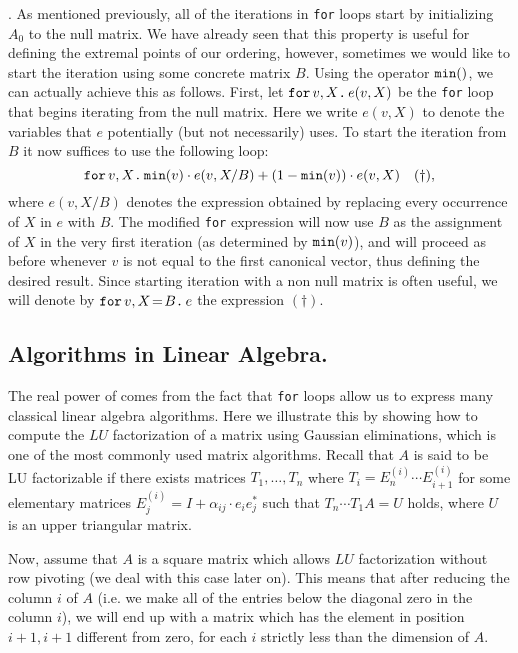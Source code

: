 .  As mentioned previously, all of the iterations in \texttt{for} loops start by initializing $A_0$ to the null matrix. We have already seen that this property is useful for defining the extremal points of our ordering, however, sometimes we would like to start the iteration using some concrete matrix $B$. Using the operator $\mmin$, we can actually achieve this as follows. First, let $\ffor{v}{X}{e(v,X)}$ be the \texttt{for} loop that begins iterating from the null matrix. Here we write $e(v,X)$ to denote the variables that $e$ potentially (but not necessarily) uses. To start the iteration from $B$ it now suffices to use the following loop:
$$\ffor{v}{X}{\mmin{v}\cdot e(v,X/B) + (1-\mmin{v})\cdot e(v,X)} \quad (\dag),$$
where $e(v,X/B)$ denotes the expression obtained by replacing every occurrence of $X$ in $e$ with $B$. The modified \texttt{for} expression will now use $B$ as the assignment of $X$ in the very first iteration (as determined by $\mmin{v}$), and will proceed as before whenever $v$ is not equal to the first canonical vector, thus defining the desired result. Since starting iteration with a non null matrix is often useful, we will denote  by $\initf{B}{v}{X}{e}$ the expression $(\dag)$.



\subsection{Algorithms in Linear Algebra.} The real power of \langfor comes from the fact that \texttt{for} loops allow us to express many classical linear algebra algorithms. Here we illustrate this by showing how to compute the $LU$ factorization of a matrix using Gaussian eliminations, which is one of the most commonly used matrix algorithms. Recall that $A$ is said to be LU factorizable if there exists matrices $T_1,\ldots, T_{n}$ where $T_i=E_{n}^{(i)}\cdots E_{i+1}^{(i)}$ for some elementary matrices $E_{j}^{(i)}=I+\alpha_{ij}\cdot e_{i}e_{j}^{*}$ such that $T_{n}\cdots T_1A=U$ holds, where $U$ is an upper triangular matrix.

Now, assume that $A$ is a square matrix which allows $LU$ factorization without row pivoting (we deal with this case later on). This means that after reducing the column $i$ of $A$ (i.e. we make all of the entries below the diagonal zero in the column $i$), we will end up with a matrix which has the element in position $i+1,i+1$ different from zero, for each $i$ strictly less than the dimension of $A$. 

